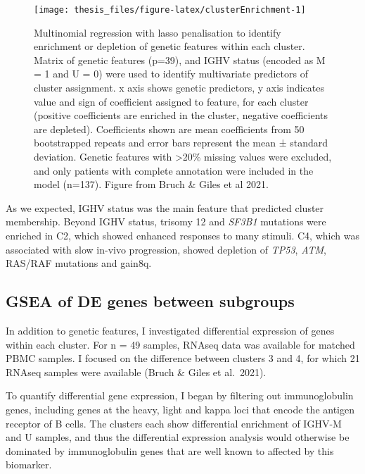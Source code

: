 \documentclass[11pt, a4paper, twosided]{book}
\begin{document}
\begin{figure}

{\centering \texttt{[image: thesis\_files/figure-latex/clusterEnrichment-1]} 

}

\caption{Multinomial regression with lasso penalisation to identify enrichment or depletion of genetic features within each cluster. Matrix of genetic features (p=39), and IGHV status (encoded as M = 1 and U = 0) were used to identify multivariate predictors of cluster assignment. x axis shows genetic predictors, y axis indicates value and sign of coefficient assigned to feature, for each cluster (positive coefficients are enriched in the cluster, negative coefficients are depleted). Coefficients shown are mean coefficients from 50 bootstrapped repeats and error bars represent the mean ± standard deviation. Genetic features with \textgreater20\% missing values were excluded, and only patients with complete annotation were included in the model (n=137). Figure from Bruch \& Giles et al 2021.}\label{fig:clusterEnrichment}
\end{figure}
As we expected, IGHV status was the main feature that predicted cluster membership. Beyond IGHV status, trisomy 12 and \emph{SF3B1} mutations were enriched in C2, which showed enhanced responses to many stimuli. C4, which was associated with slow in-vivo progression, showed depletion of \emph{TP53}, \emph{ATM}, RAS/RAF mutations and gain8q.

\hypertarget{gsea-of-de-genes-between-subgroups}{%
\subsection{GSEA of DE genes between subgroups}\label{gsea-of-de-genes-between-subgroups}}

In addition to genetic features, I investigated differential expression of genes within each cluster. For n = 49 samples, RNAseq data was available for matched PBMC samples. I focused on the difference between clusters 3 and 4, for which 21 RNAseq samples were available (Bruch \& Giles et al.~2021).

To quantify differential gene expression, I began by filtering out immunoglobulin genes, including genes at the heavy, light and kappa loci that encode the antigen receptor of B cells. The clusters each show differential enrichment of IGHV-M and U samples, and thus the differential expression analysis would otherwise be dominated by immunoglobulin genes that are well known to affected by this biomarker.
\end{document}
